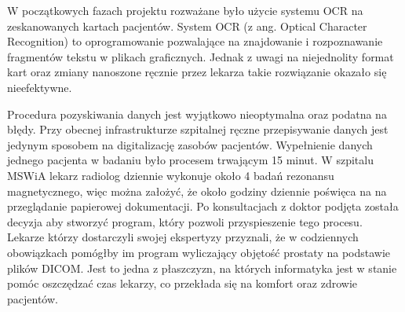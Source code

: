 \documentclass[a4paper,11pt,twoside]{report}
\theoremstyle{definition}
\begin{document}
\par
W początkowych fazach projektu rozważane było użycie systemu OCR na zeskanowanych kartach pacjentów. System OCR (z ang. Optical Character Recognition) to oprogramowanie pozwalające na znajdowanie i rozpoznawanie fragmentów tekstu w plikach graficznych. Jednak z uwagi na niejednolity format kart oraz zmiany nanoszone ręcznie przez lekarza takie rozwiązanie okazało się nieefektywne.
\par
Procedura pozyskiwania danych jest wyjątkowo nieoptymalna oraz podatna na błędy. Przy obecnej infrastrukturze szpitalnej ręczne przepisywanie danych jest jedynym sposobem na digitalizację zasobów pacjentów. Wypełnienie danych jednego pacjenta w badaniu było procesem trwającym 15 minut. W szpitalu MSWiA lekarz radiolog dziennie wykonuje około 4 badań rezonansu magnetycznego, więc można założyć, że około godziny dziennie poświęca na na przeglądanie papierowej dokumentacji. Po konsultacjach z doktor podjęta została decyzja aby stworzyć program, który pozwoli przyspieszenie tego procesu. Lekarze którzy dostarczyli swojej ekspertyzy przyznali, że w codziennych obowiązkach pomógłby im program wyliczający objętość prostaty na podstawie plików DICOM. Jest to jedna z płaszczyzn, na których informatyka jest w stanie pomóc oszczędzać czas lekarzy, co przekłada się na komfort oraz zdrowie pacjentów.
\par
\end{document}
